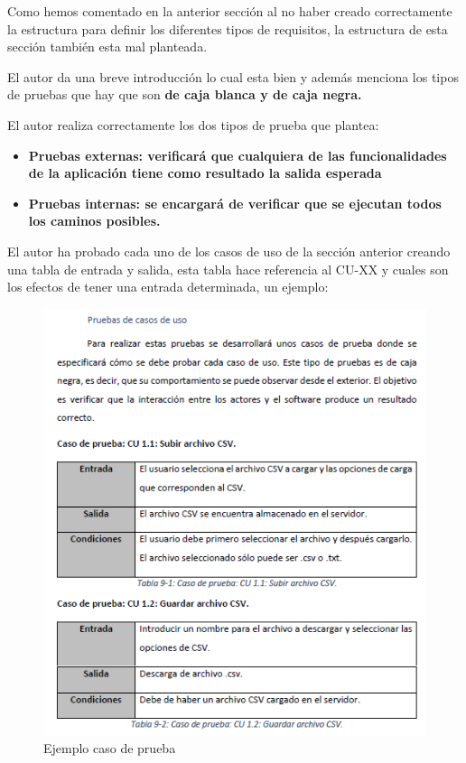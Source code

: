 Como hemos comentado en la anterior sección al no haber creado correctamente la estructura para definir los diferentes tipos de requisitos, la estructura de esta sección también esta mal planteada.

El autor da una breve introducción lo cual esta bien y además menciona los tipos de pruebas que hay que son \textbf{ de caja blanca y de caja negra.}

El autor realiza correctamente los dos tipos de prueba que plantea:
    \begin{itemize}
        \item \textbf{Pruebas externas: verificará que cualquiera de las funcionalidades de la aplicación tiene como resultado la salida esperada }
        \item \textbf{Pruebas internas: se encargará de verificar que se ejecutan todos los caminos posibles.}
    \end{itemize}

El autor ha probado cada uno de los casos de uso de la sección anterior creando una tabla de entrada y salida, esta tabla hace referencia al CU-XX y cuales son los efectos de tener una entrada determinada, un ejemplo:

\begin{figure}[H]
  \includegraphics[scale=0.7]{capitulos/img/img4.PNG}
  \caption{Ejemplo caso de prueba}
  \label{fig:img4}
\end{figure}

